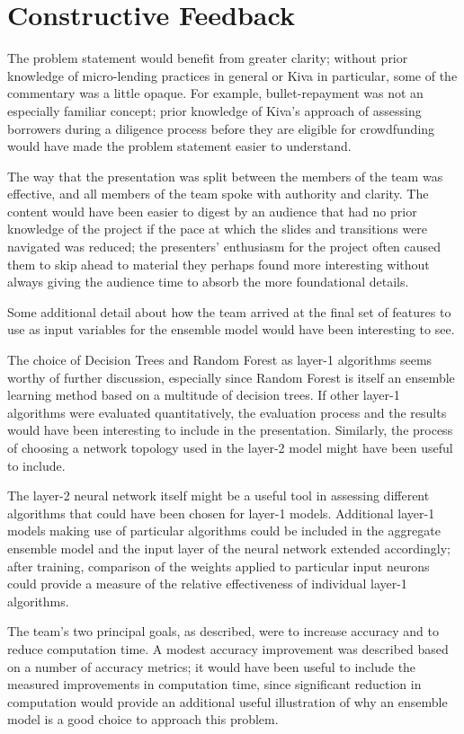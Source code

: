 \documentclass[fontsize=9pt,letterpaper,twocolumn]{scrartcl}
\begin{document}
\section{Constructive Feedback}

The problem statement would benefit from greater clarity; without prior knowledge of micro-lending practices in general or Kiva in particular, some of the commentary was a little opaque. For example, bullet-repayment was not an especially familiar concept; prior knowledge of Kiva's approach of assessing borrowers during a diligence process before they are eligible for crowdfunding would have made the problem statement easier to understand.

The way that the presentation was split between the members of the team was effective, and all members of the team spoke with authority and clarity. The content would have been easier to digest by an audience that had no prior knowledge of the project if the pace at which the slides and transitions were navigated was reduced; the presenters' enthusiasm for the project often caused them to skip ahead to material they perhaps found more interesting without always giving the audience time to absorb the more foundational details.

Some additional detail about how the team arrived at the final set of features to use as input variables for the ensemble model would have been interesting to see.

The choice of Decision Trees and Random Forest as layer-1 algorithms seems worthy of further discussion, especially since Random Forest is itself an ensemble learning method based on a multitude of decision trees. If other layer-1 algorithms were evaluated quantitatively, the evaluation process and the results would have been interesting to include in the presentation. Similarly, the process of choosing a network topology used in the layer-2 model might have been useful to include.

The layer-2 neural network itself might be a useful tool in assessing different algorithms that could have been chosen for layer-1 models. Additional layer-1 models making use of particular algorithms could be included in the aggregate ensemble model and the input layer of the neural network extended accordingly; after training, comparison of the weights applied to particular input neurons could provide a measure of the relative effectiveness of individual layer-1 algorithms.

The team's two principal goals, as described, were to increase accuracy and to reduce computation time. A modest accuracy improvement was described based on a number of accuracy metrics; it would have been useful to include the measured improvements in computation time, since significant reduction in computation would provide an additional useful illustration of why an ensemble model is a good choice to approach this problem.



\end{document}
